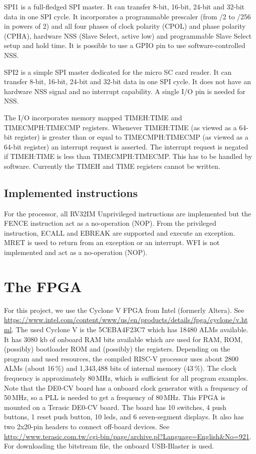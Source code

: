\documentclass[12pt]{article}
\begin{document}
SPI1 is a full-fledged SPI master. It can transfer 8-bit, 16-bit, 24-bit and 32-bit data in one SPI cycle. It incorporates a programmable prescaler (from /2 to /256 in powers of 2) and all four phases of clock polarity (CPOL) and phase polarity (CPHA), hardware NSS (Slave Select, active low) and programmable Slave Select setup and hold time. It is possible to use a GPIO pin to use software-controlled NSS.

SPI2 is a simple SPI master dedicated for the micro SC card reader. It can transfer 8-bit, 16-bit, 24-bit and 32-bit data in one SPI cycle. It does not have an hardware NSS signal and no interrupt capability. A single I/O pin is needed for NSS.

The I/O incorporates memory mapped TIMEH:TIME and TIMECMPH:TIMECMP registers. Whenever TIMEH:TIME (as viewed as a 64-bit register) is greater than or equal to TIMECMPH:TIMECMP (as viewed as a 64-bit register) an interrupt request is asserted. The interrupt request is negated if TIMEH:TIME is less than TIMECMPH:TIMECMP. This has to be handled by software. Currently the TIMEH and TIME registers cannot be written.

\subsection{Implemented instructions}
For the processor, all RV32IM Unprivileged instructions are implemented but the FENCE instruction act as a no-operation (NOP). From the privileged instruction, ECALL and EBREAK are supported and execute an exception. MRET is used to return from an exception or an interrupt. WFI is not implemented and act as a no-operation (NOP).

\section{The FPGA}
For this project, we use the Cyclone V FPGA from Intel (formerly Altera). See \url{https://www.intel.com/content/www/us/en/products/details/fpga/cyclone/v.html}.
The used Cyclone V is the 5CEBA4F23C7 which has 18480 ALMs available. It has 3080 kb of onboard RAM bits available which are used for RAM, ROM, (possibly) bootloader ROM and (possibly) the registers. Depending on the program and used resources, the compiled RISC-V processor uses about 2800 ALMs (about 16\,\%) and 1,343,488 bits of internal memory (43\,\%). The clock frequency is approximately 80\,MHz, which is sufficient for all program examples. Note that the DE0-CV board has a onboard clock generator with a frequency of 50\,MHz, so a PLL is needed to get a frequency of 80\,MHz. This FPGA is mounted on a Terasic DE0-CV board. The board has 10 switches, 4 push buttons, 1 reset push button, 10 leds, and 6 seven-segment displays. It also has two 2x20-pin headers to connect off-board devices. See \url{http://www.terasic.com.tw/cgi-bin/page/archive.pl?Language=English&No=921}. For downloading the bitstream file, the onboard USB-Blaster is used.
\end{document}
